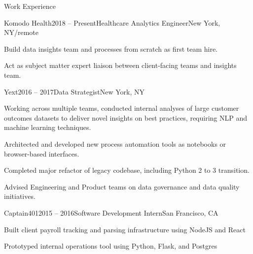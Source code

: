 \documentclass{resume} %
\begin{document}




\begin{rSection}{Work Experience}
\begin{rSubsection}{Komodo Health}{2018 -- Present}{Healthcare Analytics Engineer}{New York, NY/remote}
\item Build data insights team and processes from scratch as first team hire.
\item Act as subject matter expert liaison between client-facing teams and insights team.

\end{rSubsection}
\begin{rSubsection}{Yext}{2016 -- 2017}{Data Strategist}{New York, NY}
\item Working across multiple teams, conducted internal analyses of large customer outcomes datasets to deliver novel insights on best practices, requiring NLP and machine learning techniques.
\item Architected and developed new process automation tools as notebooks or browser-based interfaces.
\item Completed major refactor of legacy codebase, including Python 2 to 3 transition.
\item Advised Engineering and Product teams on data governance and data quality initiatives.

\end{rSubsection}

\begin{rSubsection}{Captain401}{2015 -- 2016}{Software Development Intern}{San Francisco, CA}
\item Built client payroll tracking and parsing infrastructure using NodeJS and React
\item Prototyped internal operations tool using Python, Flask, and Postgres

\end{rSubsection}



\end{rSection}
\end{document}
